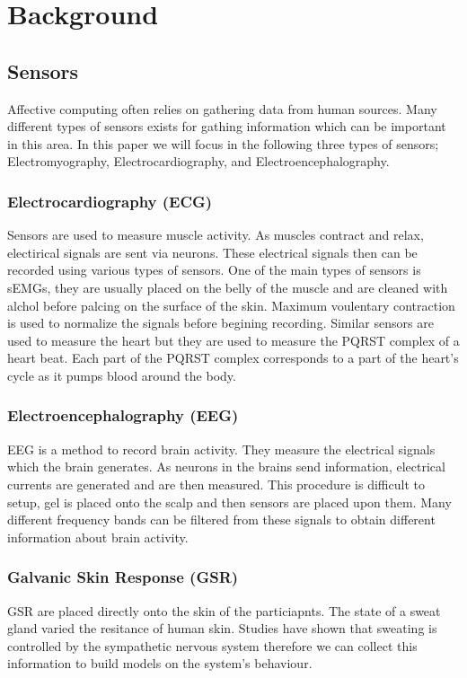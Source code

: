 \section{Background}
\label{sec:background}
\subsection{Sensors}
Affective computing often relies on gathering data from human sources.
Many different types of sensors exists for
gathing information which can be important in this area.
In this paper we will focus in the following three types of sensors;
Electromyography,
Electrocardiography,
and Electroencephalography.

\subsubsection{Electrocardiography (ECG)}
Sensors are used to measure muscle activity.
As muscles contract and relax,
electirical signals are sent via neurons.
These electrical signals then
can be recorded using various types of sensors.
One of the main types of sensors is sEMGs,
they are usually placed on the belly of the muscle
and are cleaned with alchol before palcing
on the surface of the skin.
Maximum voulentary contraction is used to normalize the signals
before begining recording.
Similar sensors are used to measure the heart
but they are used to measure the PQRST complex of a heart beat.
Each part of the PQRST complex
corresponds to a part of the heart's cycle as it pumps blood around the body.

\subsubsection{Electroencephalography (EEG)}
EEG is a method to record brain activity.
They measure the electrical signals which the brain generates.
As neurons in the brains send information,
electrical currents are generated and are then measured.
This procedure is difficult to setup,
gel is placed onto the scalp and then sensors are placed upon them.
Many different frequency bands can be filtered from these
signals to obtain different information about brain activity.

\subsubsection{Galvanic Skin Response (GSR)}
GSR are placed directly onto the skin of the particiapnts.
The state of a sweat gland varied the resitance of human skin.
Studies have shown that sweating is controlled by the sympathetic nervous system
therefore we can collect this information
to build models on the system's behaviour.

